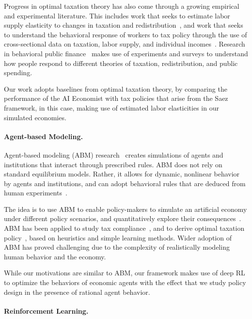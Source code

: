 Progress in optimal taxation theory has also come through a growing empirical and experimental literature.
This includes work that seeks to estimate labor supply elasticity to changes in taxation and redistribution~\citep{gruber2002elasticity,chetty2012bounds,goldberg2016kwacha}, and work that seeks to understand the behavioral response of workers to tax policy through the use of cross-sectional data on taxation, labor supply, and individual incomes~\citep{slemrod1996high,goolsbee2000happens,alesina2005work}.
Research in behavioral public finance~\citep{mccaffery2006behavioral,kuziemko2015elastic,alesina2018intergenerational} makes use of experiments and surveys to understand how
people respond to different theories of taxation, redistribution, and public spending.

Our work adopts baselines from  optimal taxation theory, by comparing the performance of the AI Economist with tax policies that arise from the Saez  framework, in this case, making use of estimated labor elasticities in our simulated economies.
\paragraph{Agent-based Modeling.}

Agent-based modeling (ABM) research~\citep{holland1991artificial,bonabeau_agent-based_2002} creates simulations of agents and institutions that interact through prescribed rules.
ABM does not rely on standard equilibrium models. Rather, it allows for dynamic, nonlinear behavior by agents and institutions, and can adopt behavioral rules that are deduced from human experiments~\citep{arthur_designing_1991}.

The idea is to use ABM to enable policy-makers to simulate an artificial economy under different policy scenarios, and quantitatively explore their consequences~\citep{farmer_economy_2009}.
ABM has been applied to study tax compliance~\citep{bloomquist_tax_2011-1,miguel_exploring_2012,subburaj_theory_2018}, and to derive optimal taxation policy~\citep{garrido_agent_2013}, based on heuristics and simple learning methods.
Wider adoption of ABM has proved challenging due to the complexity of realistically modeling human behavior and the economy.

While our motivations are similar to ABM, our framework makes use of deep RL to optimize the behaviors of economic agents with the effect that we study policy design in the presence of rational agent behavior.

\paragraph{Reinforcement Learning.}

